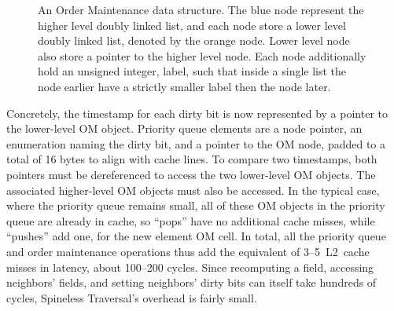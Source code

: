 \begin{figure}
\caption{An Order Maintenance data structure. The blue node represent the higher level doubly linked list, and each node store a lower level doubly linked list, denoted by the orange node. Lower level node also store a pointer to the higher level node. Each node additionally hold an unsigned integer, label, such that inside a single list the node earlier have a strictly smaller label then the node later.}
\label{fig:om}
\end{figure}

Concretely, the timestamp for each dirty bit
  is now represented by a pointer to the lower-level OM object.
Priority queue elements are a node pointer,
  an enumeration naming the dirty bit,
  and a pointer to the OM node,
  padded to a total of 16 bytes to align with cache lines.
To compare two timestamps, both pointers must be dereferenced
  to access the two lower-level OM objects.
The associated higher-level OM objects must also be accessed.
In the typical case, where the priority queue remains small,
  all of these OM objects in the priority queue
  are already in cache,
  so ``pops'' have no additional cache misses,
  while ``pushes'' add one, for the new element OM cell.
In total, all the priority queue and order maintenance operations
  thus add the equivalent of 3--5~L2~cache misses in latency,
  about 100--200 cycles.
Since recomputing a field, accessing neighbors' fields,
  and setting neighbors' dirty bits can itself take hundreds of cycles,
  Spineless Traversal's overhead is fairly small.

